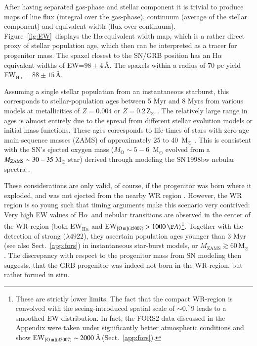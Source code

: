 \documentclass[traditabstract]{aa}
\newcommand{\farc}{\hbox{$.\!\!^{\prime\prime}$}}
\newcommand{\ha}{H$\alpha$}
\newcommand{\hei}{\ion{He}{i}}
\newcommand{\oiii}{[\ion{O}{iii}]}
\begin{document}
After having separated gas-phase and stellar component it is trivial to produce maps of line flux (integral over the gas-phase), continuum (average of the stellar component) and equivalent width (flux over continuum). Figure~\ref{fig:EW}~displays the \ha\,equivalent width map, which is a rather direct proxy of stellar population age, which then can be interpreted as a tracer for progenitor mass. The spaxel closest to the SN/GRB position has an \ha\,equivalent widths of EW=$98\pm4$\,\AA. The spaxels within a radius of 70 pc yield EW$_{\mathrm{H\alpha}}=88\pm15$\,\AA. 

Assuming a single stellar population from an instantaneous starburst, this corresponds to stellar-population ages between 5 Myr and 8 Myrs from various models at metallicities of $Z=0.004$ or $Z=0.2$\,Z$_{\odot}$ \citep[see e.g.][and references therein]{2013ApJ...779..170L, 2016arXiv160703446K}. The relatively large range in ages is almost entirely due to the spread from different stellar evolution models or initial mass functions. These ages corresponds to life-times of stars with zero-age main sequence masses (ZAMS) of approximately 25 to 40~M$_{\odot}$ \citep{1994A&AS..105...29F, 2005A&A...429..581M}. This is consistent with the SN's ejected oxygen mass ($M_{\mathrm{O}}\sim5-6$~M$_{\odot}$ evolved from a $M_{\rm{ZAMS}} \sim 30-35$\,M$_{\odot}$ star) derived through modeling the SN\,1998bw nebular spectra  \citep{2001ApJ...559.1047M, 2006ApJ...640..854M}.

These considerations are only valid, of course, if the progenitor was born where it exploded, and was not ejected from the nearby WR region \citep{2006A&A...454..103H}. However, the WR region is so young such that timing arguments make this scenario very contrived: Very high EW values of \ha~and nebular transitions are observed in the center of the WR-region (both EW$_{\mathrm{H\alpha}}$ and EW$_{\oiii(\lambda5007)}>1000\,\AA)$\footnote{These are strictly lower limits. The fact that the compact WR-region is convolved with the seeing-introduced spatial scale of $\sim$0\farc{9} leads to a smoothed EW distribution. In fact, the FORS2 data discussed in the Appendix were taken under significantly better atmospheric conditions and show EW$_{\oiii(\lambda5007)}\sim2000$\,\AA\,(Sect.~\ref{app:fors}).}. Together with the detection of strong \hei($\lambda4922$), they ascertain population ages younger than 3 Myr (see also Sect.~\ref{app:fors}) in instantaneous star-burst models, or $M_{\mathrm{ZAMS}} \gtrsim 60$\,M$_{\odot}$ \citep[see e.g.][and references therein]{2015MNRAS.451L..65T}. The discrepancy with respect to the progenitor mass from SN modeling then suggests, that the GRB progenitor was indeed not born in the WR-region, but rather formed in situ. 
\end{document}
